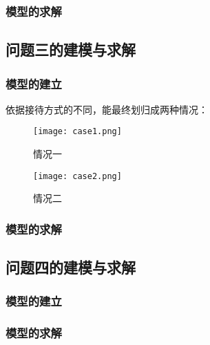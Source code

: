 \documentclass{cumcmthesis}
\begin{document}
\subsubsection{模型的求解}


\newpage
\subsection{问题三的建模与求解}
\subsubsection{模型的建立}
依据接待方式的不同，能最终划归成两种情况：
\begin{figure}[!h]
	\centering
	\texttt{[image: case1.png]}
	\caption{情况一}
\end{figure}

\begin{figure}[!h]
	\centering
	\texttt{[image: case2.png]}
	\caption{情况二}
\end{figure}


\subsubsection{模型的求解}

\newpage
\subsection{问题四的建模与求解}
\subsubsection{模型的建立}


\subsubsection{模型的求解}
\end{document}
